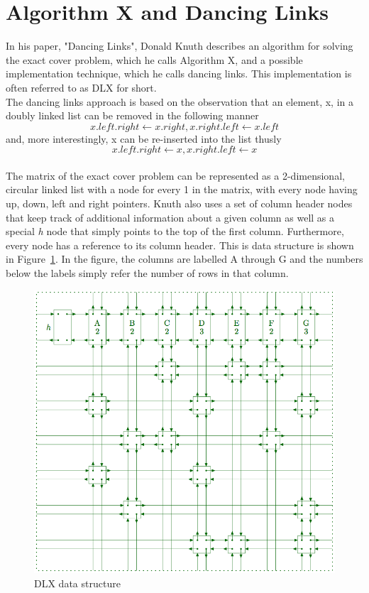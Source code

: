 \documentclass[12pt]{article}
\newcounter{row}
\newcounter{col}
\begin{document}
\section{Algorithm X and Dancing Links}
In his paper, "Dancing Links", Donald Knuth describes an algorithm for solving the exact cover problem, which he calls Algorithm X, and a possible implementation technique, which he calls dancing links. This implementation is often referred to as DLX for short. \\
The dancing links approach is based on the observation that an element, x, in a doubly linked list can be removed in the following manner
\[ x.left.right \gets x.right, x.right.left \gets x.left \]
and, more interestingly, x can be re-inserted into the list thusly
\[ x.left.right \gets x, x.right.left \gets x \]
\\
The matrix of the exact cover problem can be represented as a 2-dimensional, circular linked list with a node for every 1 in the matrix, with every node having up, down, left and right pointers. Knuth also uses a set of column header nodes that keep track of additional information about a given column as well as a special \textit{h} node that simply points to the top of the first column. Furthermore, every node has a reference to its column header. This is data structure is shown in Figure~\ref{dlx}. In the figure, the columns are labelled A through G and the numbers below the labels simply refer the number of rows in that column.
\begin{figure}[!ht]
\begin{center}
\includegraphics[width=0.9\columnwidth]{dancing_links}
\caption{DLX data structure}
\label{dlx}
\end{center}
\end{figure}
\end{document}
